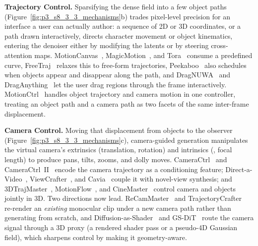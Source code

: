 \noindent\textbf{Trajectory Control.} Sparsifying the dense field into a few object paths (Figure~\ref{fig:p3_s8_3_3_mechanisms}b) trades pixel-level precision for an interface a user can actually author: a sequence of 2D or 3D coordinates, or a path drawn interactively, directs character movement or object kinematics, entering the denoiser either by modifying the latents or by steering cross-attention maps. MotionCanvas~\cite{xing2025motioncanvas}, MagicMotion~\cite{li2025magicmotion}, and Tora~\cite{zhang2025tora} consume a predefined curve, FreeTraj~\cite{qiu2024freetraj} relaxes this to free-form trajectories, Peekaboo~\cite{jain2024peekaboo} also schedules when objects appear and disappear along the path, and DragNUWA~\cite{yin2023dragnuwa} and DragAnything~\cite{wu2024draganything} let the user drag regions through the frame interactively. MotionCtrl~\cite{wang2024motionctrl} handles object trajectory and camera motion in one controller, treating an object path and a camera path as two facets of the same inter-frame displacement.

\noindent\textbf{Camera Control.} Moving that displacement from objects to the observer (Figure~\ref{fig:p3_s8_3_3_mechanisms}c), camera-guided generation manipulates the virtual camera's extrinsics (translation, rotation) and intrinsics (\eg, focal length) to produce pans, tilts, zooms, and dolly moves. CameraCtrl~\cite{he2024cameractrl} and CameraCtrl~II~\cite{he2025cameractrl} encode the camera trajectory as a conditioning feature; Direct-a-Video~\cite{yang2024direct}, ViewCrafter~\cite{yu2024viewcrafter}, and Cavia~\cite{xu2024cavia} couple it with novel-view synthesis; and 3DTrajMaster~\cite{fu20243dtrajmaster}, MotionFlow~\cite{meral2024motionflow}, and CineMaster~\cite{wang2025cinemaster} control camera and objects jointly in 3D. Two directions now lead. ReCamMaster~\cite{bai2025recammaster} and TrajectoryCrafter~\cite{yu2025trajectorycrafter} re-render an \emph{existing} monocular clip under a new camera path rather than generating from scratch, and Diffusion-as-Shader~\cite{gu2025diffusionshader3dawarevideo} and GS-DiT~\cite{bian2025gsditadvancingvideogeneration} route the camera signal through a 3D proxy (a rendered shader pass or a pseudo-4D Gaussian field), which sharpens control by making it geometry-aware.

